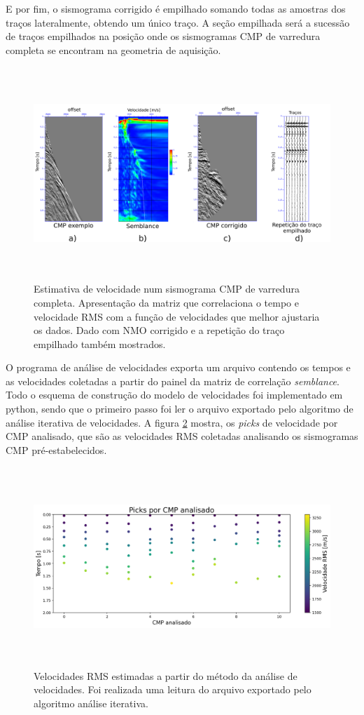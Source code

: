 \documentclass[
	12pt,				%
	openright,			%
	oneside,			%
	a4paper,			%
	english,			%
	brazil				%
	]{abntex2}
\begin{document}
	E por fim, o sismograma corrigido é empilhado somando todas as amostras dos traços lateralmente, obtendo um único traço. A seção empilhada será a sucessão de traços empilhados na posição onde os sismogramas CMP de varredura completa se encontram na geometria de aquisição. 

    \begin{figure}[htp!]
		\centering
		\includegraphics[width=16cm,height=8cm]{../imagens/processamentoReal.png}
		\caption{Estimativa de velocidade num sismograma CMP de varredura completa. Apresentação da matriz que correlaciona o tempo e velocidade RMS com a função de velocidades que melhor ajustaria os dados. Dado com NMO corrigido e a repetição do traço empilhado também mostrados.}
		\label{realProc}
	\end{figure}

	O programa de análise de velocidades exporta um arquivo contendo os tempos e as velocidades coletadas a partir do painel da matriz de correlação \textit{semblance}. Todo o esquema de construção do modelo de velocidades foi implementado em python, sendo que o primeiro passo foi ler o arquivo exportado pelo algoritmo de análise iterativa de velocidades. A figura \ref{picks} mostra, os \textit{picks} de velocidade por CMP analisado, que são as velocidades RMS coletadas analisando os sismogramas CMP pré-estabelecidos.
	
    \begin{figure}[htp!]
		\centering
		\includegraphics[width=16cm,height=7.5cm]{../imagens/picksFocado.png}
		\caption{Velocidades RMS estimadas a partir do método da análise de velocidades. Foi realizada uma leitura do arquivo exportado pelo algoritmo análise iterativa.}
		\label{picks}
	\end{figure}
	
\end{document}
